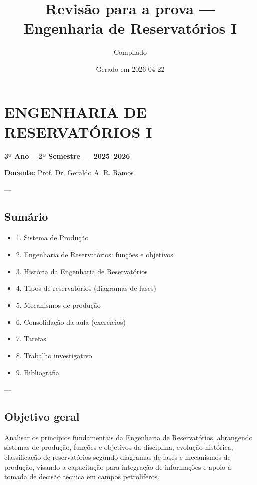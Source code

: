 \documentclass[11pt,a4paper]{article}
\title{Revisão para a prova — Engenharia de Reservatórios I}
\author{Compilado}
\date{Gerado em 2026-04-22}
\begin{document}
\maketitle
\tableofcontents
\clearpage

\section{ENGENHARIA DE RESERVATÓRIOS I}
 \textbf{3º Ano – 2º Semestre — 2025–2026}

 \textbf{Docente:} Prof. Dr. Geraldo A. R. Ramos

 ---

\subsection{Sumário}
\begin{itemize}
\item 1. Sistema de Produção
\item 2. Engenharia de Reservatórios: funções e objetivos
\item 3. História da Engenharia de Reservatórios
\item 4. Tipos de reservatórios (diagramas de fases)
\item 5. Mecanismos de produção
\item 6. Consolidação da aula (exercícios)
\item 7. Tarefas
\item 8. Trabalho investigativo
\item 9. Bibliografia
\end{itemize}

 ---

\subsection{Objetivo geral}
 Analisar os princípios fundamentais da Engenharia de Reservatórios, abrangendo sistemas de produção, funções e objetivos da disciplina, evolução histórica, classificação de reservatórios segundo diagramas de fases e mecanismos de produção, visando a capacitação para integração de informações e apoio à tomada de decisão técnica em campos petrolíferos.
\end{document}
